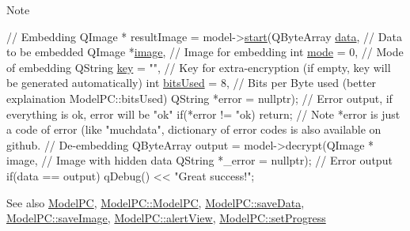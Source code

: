 \begin{DoxyNote}{Note}
\begin{DoxyCode}
\textcolor{comment}{// Embedding}
QImage * resultImage = model->\mbox{\hyperlink{class_model_p_c_a3cae34fd5bcb06e8c1f8cfe7961bd270}{start}}(QByteArray \mbox{\hyperlink{namespace_errors_dict_setup_af570460846fb9f0c91abd308a095dcdc}{data}}, \textcolor{comment}{// Data to be embedded}
                                    QImage *\mbox{\hyperlink{namespacetests-setup_ad55b685280f549e15688a94cbb89f512}{image}}, \textcolor{comment}{// Image for embedding}
                                    \textcolor{keywordtype}{int} \mbox{\hyperlink{namespacetests-setup_a04126d10edec6b3171e1b55a00309b23}{mode}} = 0, \textcolor{comment}{// Mode of embedding}
                                    QString \mbox{\hyperlink{namespace_errors_dict_setup_a09c268098d09ffb8e5504f30fa6d5dd9}{key}} = \textcolor{stringliteral}{""}, \textcolor{comment}{// Key for extra-encryption (if empty, key will be
       generated automatically)}
                                    \textcolor{keywordtype}{int} \mbox{\hyperlink{namespacetests-setup_a64974eb034f518d24195739395783d3d}{bitsUsed}} = 8, \textcolor{comment}{// Bits per Byte used (better explaination
       ModelPC::bitsUsed)}
                                    QString *error = \textcolor{keyword}{nullptr}); \textcolor{comment}{// Error output, if everything is ok, error
       will be "ok"}
\textcolor{keywordflow}{if}(*error != \textcolor{stringliteral}{"ok)}
\textcolor{stringliteral}{    return;}
\textcolor{stringliteral}{// Note *error is just a code of error (like "}muchdata\textcolor{stringliteral}{", dictionary of error codes is also available on
       github.}
\textcolor{stringliteral}{}
\textcolor{stringliteral}{// De-embedding}
\textcolor{stringliteral}{QByteArray output = model->decrypt(QImage * image, // Image with hidden data}
\textcolor{stringliteral}{                                   QString *\_error = nullptr); // Error output}
\textcolor{stringliteral}{if(data == output)}
\textcolor{stringliteral}{   qDebug() << "}Great success!\textcolor{stringliteral}{";}
\end{DoxyCode}
 
\end{DoxyNote}
\begin{DoxySeeAlso}{See also}
\mbox{\hyperlink{class_model_p_c}{Model\+PC}}, \mbox{\hyperlink{class_model_p_c_ae12ebe65ec973c02a0de4850a7c1e31c}{Model\+P\+C\+::\+Model\+PC}}, \mbox{\hyperlink{class_model_p_c_a67c4fd6db2cd4a3bb23a2fc48f7cceff}{Model\+P\+C\+::save\+Data}}, \mbox{\hyperlink{class_model_p_c_a5af79bd5fd50d7be0646778bc99413b9}{Model\+P\+C\+::save\+Image}}, \mbox{\hyperlink{class_model_p_c_aef1f058227af54e4cfc9fc4c4397d30c}{Model\+P\+C\+::alert\+View}}, \mbox{\hyperlink{class_model_p_c_a25a4496e129e87ac96f12257a123b84f}{Model\+P\+C\+::set\+Progress}}
\end{DoxySeeAlso}
